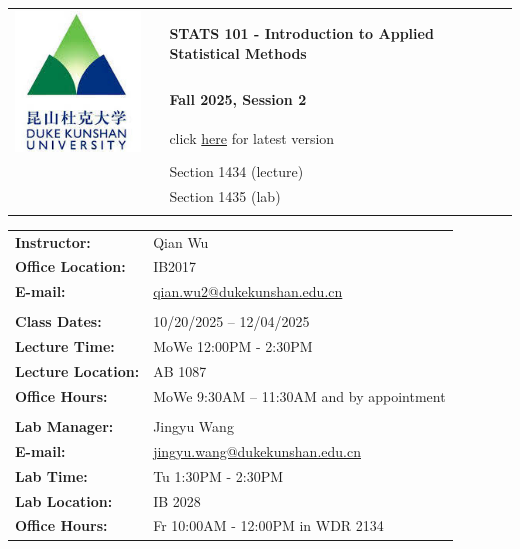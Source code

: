 \documentclass[11pt]{article}
\begin{document}
\noindent \hspace{-4mm} \begin{tabular}{ l c l }
  \multirow{3}{*}{\includegraphics[scale=.5]{logo.jpeg}} && \Large\textbf{STATS 101 - Introduction to Applied Statistical Methods}\\[5pt]
  && \Large \textbf{Fall 2025, Session 2}\\[24pt]
  && click \href{https://qianwu-dku.github.io/STAT101/syllabus/syllabus.pdf}{here} for latest version \\
  && Section 1434 (lecture)\\
  && Section 1435 (lab)\\\\
\end{tabular}

\noindent  \hspace{-4mm}  \begin{tabular}{ l l }
  \textbf{Instructor:} 			& \large Qian Wu \\
  \textbf{Office Location:} 	& \large IB2017\\
  \textbf{E-mail:} 				& \large \href{mailto:qian.wu2@dukekunshan.edu.cn}{qian.wu2@dukekunshan.edu.cn} \\\\
 
  \textbf{Class Dates:}			& 10/20/2025 – 12/04/2025 \\
  \textbf{Lecture Time:}			& \large MoWe 12:00PM - 2:30PM\\
  \textbf{Lecture Location:} 		& \large AB 1087\\
    \textbf{Office Hours:} & \large MoWe 9:30AM -- 11:30AM and by appointment\\
     & \\
 \textbf{Lab Manager: }          & \large{Jingyu Wang} \\
\textbf{E-mail: }          & \large{\href{mailto:jingyu.wang@dukekunshan.edu.cn}{jingyu.wang@dukekunshan.edu.cn}} \\
 \textbf{Lab Time:}              & \large Tu 1:30PM - 2:30PM\\
 \textbf{Lab Location:}          & \large IB 2028\\
 \textbf{Office Hours:} & \large Fr 10:00AM - 12:00PM in WDR 2134\\



\end{tabular}
\end{document}
